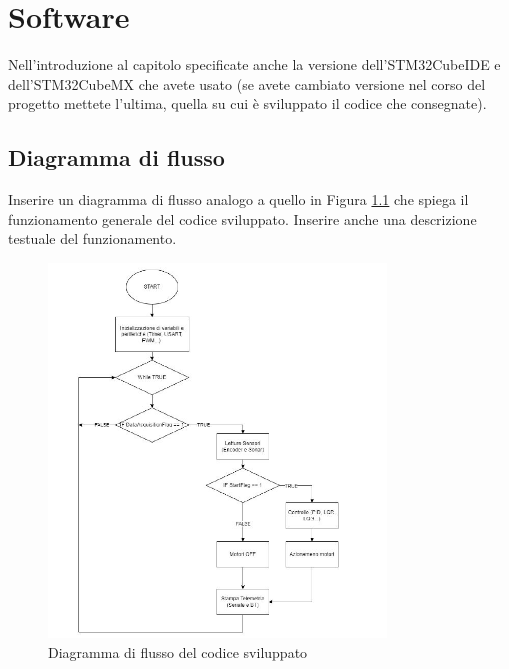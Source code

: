 \documentclass[11pt]{report}
\begin{document}
\chapter{Software}
Nell'introduzione al capitolo specificate anche la versione dell'STM32CubeIDE e dell'STM32CubeMX che avete usato (se avete cambiato versione nel corso del progetto mettete l'ultima, quella su cui è sviluppato il codice che consegnate).

\section{Diagramma di flusso}
Inserire un diagramma di flusso analogo a quello in Figura \ref{fig:diagramma} che spiega il funzionamento generale del codice sviluppato. Inserire anche una descrizione testuale del funzionamento.

\begin{figure}[H]
\centering
\includegraphics[width=0.8\textwidth,keepaspectratio]{figures/diagramma.JPG}
\caption{Diagramma di flusso del codice sviluppato}
\label{fig:diagramma}
\end{figure}
\end{document}
